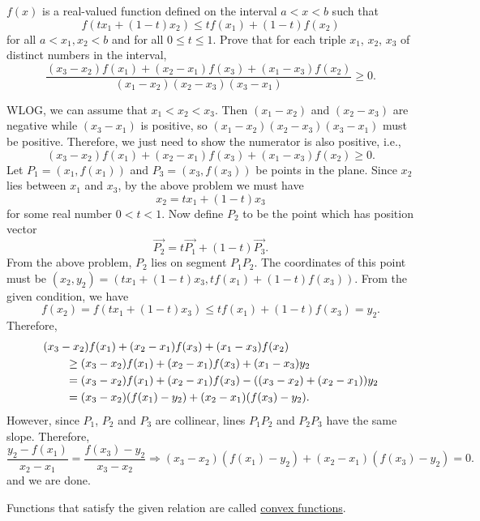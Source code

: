 \begin{question}
    $f(x)$ is a real-valued function defined on the interval $a < x < b$ such
    that 
    \[f(tx_{1} + (1 - t)x_{2}) \leq tf(x_{1}) + (1 - t)f(x_{2})\] 
    for all $a < x_{1}, x_{2} < b$ and for all $0 \leq t \leq 1$. Prove that
    for each triple $x_1$, $x_2$, $x_3$ of distinct numbers in the interval, 
    \[\frac{(x_{3} - x_{2})f(x_{1}) + (x_{2} - x_{1})f(x_{3}) + (x_{1} -
    x_{3})f(x_{2})}{(x_{1} - x_{2})(x_{2} - x_{3})(x_{3} - x_{1})}\geq 0.\]
\end{question}
\begin{solution}
    WLOG, we can assume that $x_1 < x_2 < x_3$. Then $(x_1 - x_2)$ and $(x_2 -
    x_3)$ are negative while $(x_3 - x_1)$ is positive, so $(x_1 - x_2)(x_2 -
    x_3)(x_3 - x_1)$ must be positive. Therefore, we just need to show the
    numerator is also positive, i.e.,
    \[ (x_3 - x_2)f(x_1) + (x_2 - x_1)f(x_3) + (x_1 - x_3)f(x_2) \geq 0. \]
    Let $P_1 = (x_1, f(x_1))$ and $P_3 = (x_3, f(x_3))$ be points in the plane.
    Since $x_2$ lies between $x_1$ and $x_3$, by the above problem we must have 
    \[ x_2 = tx_1 + (1 - t)x_3 \]
    for some real number $0 < t < 1$. Now define $P_2$ to be the point which
    has position vector 
    \[ \overrightarrow{P_2} = t\overrightarrow{P_1} + (1 - t)\overrightarrow{P_3}. \]
    From the above problem, $P_2$ lies on segment $P_1P_2$. The coordinates of
    this point must be $(x_2, y_2) = (tx_1 + (1 - t)x_3, tf(x_1) + (1 -
    t)f(x_3))$.
    From the given condition, we have
    \[ f(x_2) = f(tx_1 + (1 - t)x_3) \leq tf(x_1) + (1 - t)f(x_3) = y_2. \]
    Therefore,
    \begin{align*}
        \MoveEqLeft
    (x_3 - x_2)f(x_1) + (x_2 - x_1)f(x_3) + (x_1 - x_3)f(x_2)\\
        &\geq (x_3 - x_2)f(x_1) + (x_2 - x_1)f(x_3) + (x_1 - x_3)y_2\\
        &= (x_3 - x_2)f(x_1) + (x_2 - x_1)f(x_3) - ((x_3 - x_2) + (x_2 - x_1))y_2\\
        &= (x_3 - x_2)(f(x_1) - y_2) + (x_2 - x_1)(f(x_3) - y_2). 
    \end{align*}
    However, since $P_1$, $P_2$ and $P_3$ are collinear, lines $P_1P_2$ and
    $P_2P_3$ have the same slope. Therefore,
    \[ \frac{y_2 - f(x_1)}{x_2 - x_1} = \frac{f(x_3) - y_2}{x_3 - x_2}
    \Longrightarrow (x_3 - x_2)(f(x_1) - y_2) + (x_2 - x_1)(f(x_3) - y_2) = 0.
    \]
    and we are done. 
\end{solution}
\begin{remark}
    Functions that satisfy the given relation are called \href{https://en.wikipedia.org/wiki/Convex_function}{convex functions}. 
\end{remark}
